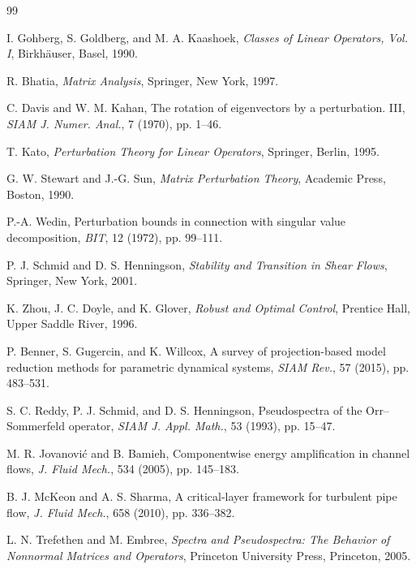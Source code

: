 \documentclass[review]{siamart220329}
\theoremstyle{definition}
\theoremstyle{remark}
\begin{document}
\begin{thebibliography}{99}

I. Gohberg, S. Goldberg, and M. A. Kaashoek, \emph{Classes of Linear Operators, Vol. I}, Birkh\"auser, Basel, 1990.

R. Bhatia, \emph{Matrix Analysis}, Springer, New York, 1997.

C. Davis and W. M. Kahan, The rotation of eigenvectors by a perturbation. III, \emph{SIAM J. Numer. Anal.}, 7 (1970), pp. 1--46.

T. Kato, \emph{Perturbation Theory for Linear Operators}, Springer, Berlin, 1995.

G. W. Stewart and J.-G. Sun, \emph{Matrix Perturbation Theory}, Academic Press, Boston, 1990.

P.-A. Wedin, Perturbation bounds in connection with singular value decomposition, \emph{BIT}, 12 (1972), pp. 99--111.

P. J. Schmid and D. S. Henningson, \emph{Stability and Transition in Shear Flows}, Springer, New York, 2001.

K. Zhou, J. C. Doyle, and K. Glover, \emph{Robust and Optimal Control}, Prentice Hall, Upper Saddle River, 1996.

P. Benner, S. Gugercin, and K. Willcox, A survey of projection-based model reduction methods for parametric dynamical systems, \emph{SIAM Rev.}, 57 (2015), pp. 483--531.

S. C. Reddy, P. J. Schmid, and D. S. Henningson, Pseudospectra of the Orr--Sommerfeld operator, \emph{SIAM J. Appl. Math.}, 53 (1993), pp. 15--47.

M. R. Jovanovi\'c and B. Bamieh, Componentwise energy amplification in channel flows, \emph{J. Fluid Mech.}, 534 (2005), pp. 145--183.

B. J. McKeon and A. S. Sharma, A critical-layer framework for turbulent pipe flow, \emph{J. Fluid Mech.}, 658 (2010), pp. 336--382.

L. N. Trefethen and M. Embree, \emph{Spectra and Pseudospectra: The Behavior of Nonnormal Matrices and Operators}, Princeton University Press, Princeton, 2005.

\end{thebibliography}
\end{document}
